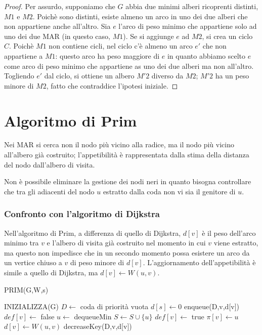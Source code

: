 \documentclass[11pt]{book}
\begin{document}
\begin{proof}
    Per assurdo, supponiamo che $G$ abbia due minimi alberi ricoprenti distinti, $M1$ e $M2$. Poichè sono distinti, esiste 
    almeno un arco in uno dei due alberi che non appartiene anche all'altro. Sia $e$ l'arco di peso minimo che appartiene 
    solo ad uno dei due MAR (in questo caso, $M1$). Se si aggiunge $e$ ad $M2$, si crea un ciclo $C$. Poichè $M1$ non 
    contiene cicli, nel ciclo c'è almeno un arco $e'$ che non appartiene a $M1$: questo arco ha peso maggiore di $e$ in 
    quanto abbiamo scelto $e$ come arco di peso minimo che appartiene as uno dei due alberi ma non all'altro.\\
    Togliendo $e'$ dal ciclo, si ottiene un albero $M'2$ diverso da $M2$; $M'2$ ha un peso minore di $M2$, fatto che contraddice 
    l'ipotesi iniziale.
\end{proof}
\section{Algoritmo di Prim}
Nei MAR si cerca non il nodo più vicino alla radice, ma il nodo più vicino all'albero già costruito; l'appetibilità è 
rappresentata dalla stima della distanza del nodo dall'albero di visita.

Non è possibile eliminare la gestione dei nodi neri in quanto bisogna controllare che tra gli adiacenti del nodo $u$ estratto 
dalla coda non vi sia il genitore di $u$.
\subsubsection{Confronto con l'algoritmo di Dijkstra}
Nell'algoritmo di Prim, a differenza di quello di Dijkstra, $d[v]$ è il peso dell'arco minimo tra $v$ e l'albero di visita 
già costruito nel momento in cui $v$ viene estratto, ma questo non impedisce che in un secondo momento possa esistere un 
arco da un vertice chiuso a $v$ di peso minore di $d[v]$.
L'aggiornamento dell'appetibilità è simile a quello di Dijkstra, ma $d[v]\leftarrow W(u,v)$.
\begin{algorithm}
    \caption{PRIM(G,W,s)}
    \begin{algorithmic}
        \State INIZIALIZZA(G)
        \State $D\gets$ coda di priorità vuota 
        \State $d[s]\gets 0$
            \State enqueue(D,v,d[v])
            \State $def[v]\gets$ false
        \EndFor
            \State $u\gets$ dequeueMin
            \State $S\gets S\cup \{u\}$
            \State $def[v]\gets$ true 
                \State $\pi[v]\gets u$
                \State $d[v]\gets W(u,v)$
                \State decreaseKey(D,v,d[v])
                \EndIf 
            \EndFor 
        \EndWhile
    \end{algorithmic}
\end{algorithm}
\end{document}
